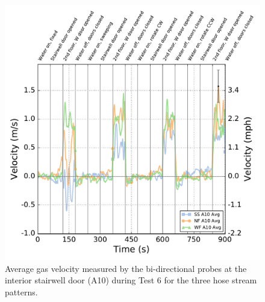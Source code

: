 \documentclass[12pt,oneside]{book}
\begin{document}
\begin{figure}[!ht]
	\includegraphics[width=\columnwidth]{../Figures/Plots/Test_18_West_063014_BDP_A10_stream_avgs}
	\caption[Average gas velocity through the interior stairwell door during Test 6 for the three hose stream patterns.]{Average gas velocity measured by the bi-directional probes at the interior stairwell door (A10) during Test 6 for the three hose stream patterns.}
	\label{fig:Test_6_BDP_A10_Avg_All}
\end{figure}
\FloatBarrier
\end{document}
